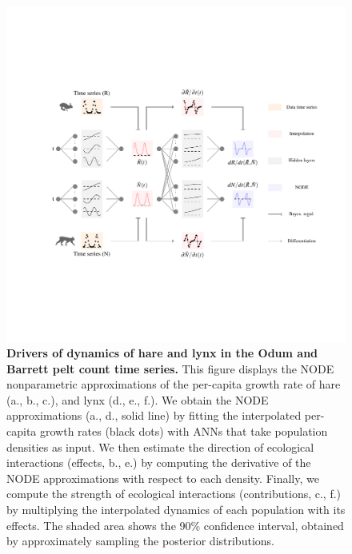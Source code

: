 \documentclass[11pt, oneside]{article}
\begin{document}
\newpage
\begin{figure}[H]
\begin{center}
\includegraphics[width=\linewidth,page=4]{figures/main.pdf}
\caption{
    \textbf{Drivers of dynamics of hare and lynx in the Odum and Barrett pelt count time series.}
    This figure displays the NODE nonparametric approximations of the per-capita growth rate of hare (a., b., c.), and lynx (d., e., f.).
    We obtain the NODE approximations (a., d., solid line) by fitting the interpolated per-capita growth rates (black dots) with ANNs that take population densities as input.
    We then estimate the direction of ecological interactions (effects, b., e.) by computing the derivative of the NODE approximations with respect to each density.
    Finally, we compute the strength of ecological interactions (contributions, c., f.) by multiplying the interpolated dynamics of each population with its effects.
    The shaded area shows the 90\% confidence interval, obtained by approximately sampling the posterior distributions. 
}
\end{center}
\end{figure}
\newpage
\end{document}
